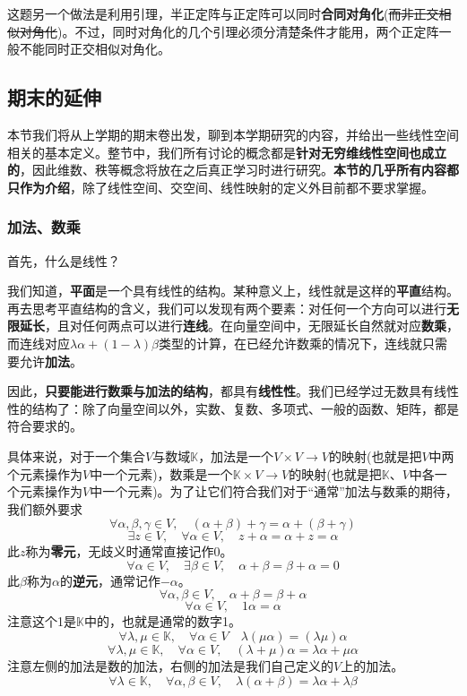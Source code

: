 \documentclass[a4paper,UTF8,fontset=windows,AutoFakeBold]{ctexart}
\newcommand*{\note}{\noindent *}
\begin{document}
\begin{enumerate}
    \note 这题另一个做法是利用引理，半正定阵与正定阵可以同时\textbf{合同对角化}(\sout{而非正交相似对角化})。不过，同时对角化的几个引理必须分清楚条件才能用，两个正定阵一般不能同时正交相似对角化。
\end{enumerate}

\subsection{期末的延伸}
本节我们将从上学期的期末卷出发，聊到本学期研究的内容，并给出一些线性空间相关的基本定义。整节中，我们所有讨论的概念都是\textbf{针对无穷维线性空间也成立的}，因此维数、秩等概念将放在之后真正学习时进行研究。\textbf{本节的几乎所有内容都只作为介绍}，除了线性空间、交空间、线性映射的定义外目前都不要求掌握。

\subsubsection{加法、数乘}
首先，什么是线性？

我们知道，\textbf{平面}是一个具有线性的结构。某种意义上，线性就是这样的\textbf{平直}结构。再去思考平直结构的含义，我们可以发现有两个要素：对任何一个方向可以进行\textbf{无限延长}，且对任何两点可以进行\textbf{连线}。在向量空间中，无限延长自然就对应\textbf{数乘}，而连线对应$\lambda\alpha+(1-\lambda)\beta$类型的计算，在已经允许数乘的情况下，连线就只需要允许\textbf{加法}。

因此，\textbf{只要能进行数乘与加法的结构}，都具有\textbf{线性性}。我们已经学过无数具有线性性的结构了：除了向量空间以外，实数、复数、多项式、一般的函数、矩阵，都是符合要求的。

具体来说，对于一个集合$V$与数域$\mathbb{K}$，加法是一个$V\times V\to V$的映射(也就是把$V$中两个元素操作为$V$中一个元素)，数乘是一个$\mathbb{K}\times V\to V$的映射(也就是把$\mathbb{K}$、$V$中各一个元素操作为$V$中一个元素)。为了让它们符合我们对于``通常''加法与数乘的期待，我们额外要求
$$\forall\alpha,\beta,\gamma\in V,\quad (\alpha+\beta)+\gamma=\alpha+(\beta+\gamma)$$
$$\exists z\in V,\quad\forall\alpha\in V,\quad z+\alpha=\alpha+z=\alpha$$
\note 此$z$称为\textbf{零元}，无歧义时通常直接记作0。
$$\forall\alpha\in V,\quad\exists\beta\in V,\quad\alpha+\beta=\beta+\alpha=0$$
\note 此$\beta$称为$\alpha$的\textbf{逆元}，通常记作$-\alpha$。
$$\forall\alpha,\beta\in V,\quad\alpha+\beta=\beta+\alpha$$
$$\forall\alpha\in V,\quad 1\alpha=\alpha$$
\note 注意这个1是$\mathbb{K}$中的，也就是通常的数字1。
$$\forall\lambda,\mu\in\mathbb{K},\quad\forall\alpha\in V\quad\lambda(\mu\alpha)=(\lambda\mu)\alpha$$
$$\forall\lambda,\mu\in\mathbb{K},\quad\forall\alpha\in V,\quad(\lambda+\mu)\alpha=\lambda\alpha+\mu\alpha$$
\note 注意左侧的加法是数的加法，右侧的加法是我们自己定义的$V$上的加法。
$$\forall\lambda\in\mathbb{K},\quad\forall\alpha,\beta\in V,\quad\lambda(\alpha+\beta)=\lambda\alpha+\lambda\beta$$
\end{document}
